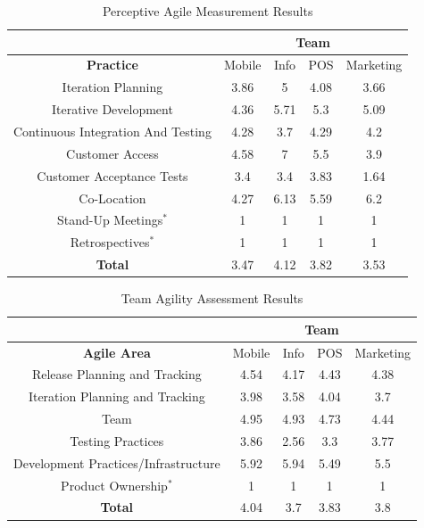 \begin{table} [H]
\caption{Perceptive Agile Measurement Results}
\label{table:pam_results}
\begin{tabular}{| c | c | c | c | c |}
\hline
  & \multicolumn{4}{c|}{\textbf{Team}} \\ \hline
\textbf{Practice} & Mobile & Info & POS & Marketing \\ \hline
Iteration Planning & 3.86 & 5 & 4.08 & 3.66 \\ \hline
Iterative Development & 4.36 & 5.71 & 5.3 & 5.09 \\ \hline
Continuous Integration And Testing & 4.28 & 3.7 & 4.29 & 4.2 \\ \hline
Customer Access & 4.58 & 7 & 5.5 & 3.9 \\ \hline
Customer Acceptance Tests & 3.4 & 3.4 & 3.83 & 1.64 \\ \hline
Co-Location & 4.27 & 6.13 & 5.59 & 6.2 \\ \hline 
Stand-Up Meetings$^\ast$ & 1 & 1 & 1 & 1 \\ \hline
Retrospectives$^\ast$ & 1 & 1 & 1 & 1 \\ \hline
\textbf{Total} & 3.47 & 4.12 & 3.82 & 3.53 \\ \hline
\end{tabular}
\end{table}

\begin{table} [H]
\caption{Team Agility Assessment Results}
\label{table:taa_results}
\begin{tabular}{| c | c | c | c | c |}
\hline
  & \multicolumn{4}{c|}{\textbf{Team}} \\ \hline
\textbf{Agile Area} & Mobile & Info & POS & Marketing \\ \hline
Release Planning and Tracking & 4.54 & 4.17 & 4.43 & 4.38 \\ \hline
Iteration Planning and Tracking & 3.98 & 3.58 & 4.04 & 3.7 \\ \hline
Team & 4.95 & 4.93 & 4.73 & 4.44 \\ \hline
Testing Practices & 3.86 & 2.56 & 3.3 & 3.77 \\ \hline
Development Practices/Infrastructure & 5.92 & 5.94 & 5.49 & 5.5 \\ \hline
Product Ownership$^\ast$ & 1 & 1 & 1 & 1 \\ \hline 
\textbf{Total} & 4.04 & 3.7 & 3.83 & 3.8 \\ \hline
\end{tabular}
\end{table}

